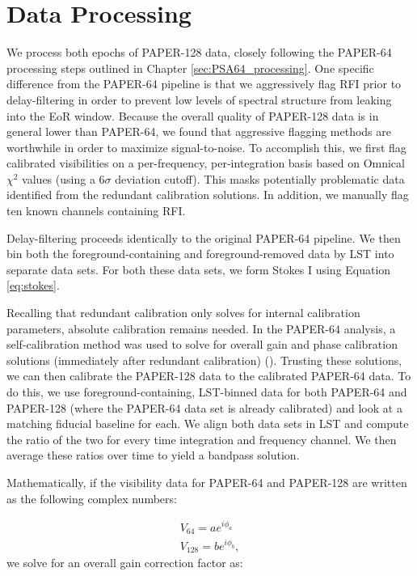 \section{Data Processing}

We process both epochs of PAPER-128 data, closely following the PAPER-64 processing steps outlined in Chapter \ref{sec:PSA64_processing}. One specific difference from the PAPER-64 pipeline is that we aggressively flag RFI prior to delay-filtering in order to prevent low levels of spectral structure from leaking into the EoR window. Because the overall quality of PAPER-128 data is in general lower than PAPER-64, we found that aggressive flagging methods are worthwhile in order to maximize signal-to-noise. To accomplish this, we first flag calibrated visibilities on a per-frequency, per-integration basis based on {\sc Omnical} $\chi^{2}$ values (using a $6\sigma$ deviation cutoff). This masks potentially problematic data identified from the redundant calibration solutions. In addition, we manually flag ten known channels containing RFI. 

Delay-filtering proceeds identically to the original PAPER-64 pipeline. We then bin both the foreground-containing and foreground-removed data by LST into separate data sets. For both these data sets, we form Stokes I using Equation \eqref{eq:stokes}.

Recalling that redundant calibration only solves for internal calibration parameters, absolute calibration remains needed. In the PAPER-64 analysis, a self-calibration method was used to solve for overall gain and phase calibration solutions (immediately after redundant calibration) (\citealt{ali_et_al2015}). Trusting these solutions, we can then calibrate the PAPER-128 data to the calibrated PAPER-64 data. To do this, we use foreground-containing, LST-binned data for both PAPER-64 and PAPER-128 (where the PAPER-64 data set is already calibrated) and look at a matching fiducial baseline for each. We align both data sets in LST and compute the ratio of the two for every time integration and frequency channel. We then average these ratios over time to yield a bandpass solution. 

Mathematically, if the visibility data for PAPER-64 and PAPER-128 are written as the following complex numbers:

\begin{eqnarray}
V_{64} = ae^{i\phi_{a}} \\
V_{128} = be^{i\phi_{b}},
\end{eqnarray}
we solve for an overall gain correction factor as:

